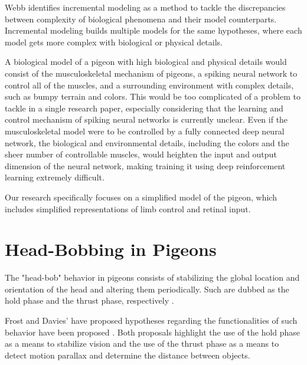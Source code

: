     Webb identifies incremental modeling as a method to tackle the discrepancies between complexity of biological phenomena and their model counterparts. Incremental modeling builds multiple models for the same hypotheses, where each model gets more complex with biological or physical details.

      A biological model of a pigeon with high biological and physical details would consist of the musculoskeletal mechanism of pigeons, a spiking neural network to control all of the muscles, and a surrounding environment with complex details, such as bumpy terrain and colors. This would be too complicated of a problem to tackle in a single research paper, especially considering that the learning and control mechanism of spiking neural networks is currently unclear. Even if the musculoskeletal model were to be controlled by a fully connected deep neural network, the biological and environmental details, including the colors and the sheer number of controllable muscles, would heighten the input and output dimension of the neural network, making training it using deep reinforcement learning extremely difficult.

      Our research specifically focuses on a simplified model of the pigeon, which includes simplified representations of limb control and retinal input.

\section{Head-Bobbing in Pigeons}
  The "head-bob" behavior in pigeons consists of stabilizing the global location and orientation of the head and altering them periodically. Such are dubbed as the hold phase and the thrust phase, respectively \cite{davies1988head}.

  Frost and Davies' have proposed hypotheses regarding the functionalities of such behavior have been proposed \cite{frost1978optokinetic} \cite{davies1988head}. Both proposals highlight the use of the hold phase as a means to stabilize vision and the use of the thrust phase as a means to detect motion parallax and determine the distance between objects.

